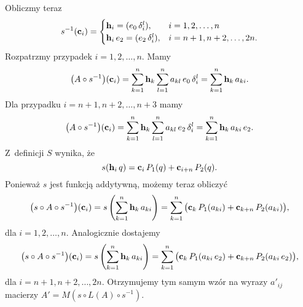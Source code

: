 \documentclass[a4paper,11pt]{article}
\begin{document}
Obliczmy teraz
\begin{equation}
  \label{eq:Wojtynski-87}
  s^{ -1 }( \mathbf{c}_{ i } ) =
  \begin{cases}
    \mathbf{h}_{ i } = ( e_{ 0 } \, \delta^{ l }_{ i } ), &i = 1, 2, \ldots, n \\
    \mathbf{h}_{ i } \, e_{ 2 } = ( e_{ 2 } \, \delta^{ l }_{ i } ),
    &i = n + 1, n + 2, \ldots, 2n.
  \end{cases}
\end{equation}
Rozpatrzmy przypadek $i = 1, 2, \ldots, n$. Mamy
\begin{equation}
  \label{eq:Wojtynski-88}
  \big( A \circ s^{ -1 } \big)( \mathbf{c}_{ i } ) =
  \sum_{ k = 1 }^{ n } \mathbf{h}_{ k } \sum_{ l = 1 }^{ n }
  a_{ k l } \, e_{ 0 } \, \delta^{ l }_{ i } =
  \sum_{ k = 1 }^{ n } \mathbf{h}_{ k } \, a_{ k i }.
\end{equation}
Dla przypadku $i = n + 1, n + 2, \ldots, n + 3$ mamy
\begin{equation}
  \label{eq:Wojtynski-89}
  \big( A \circ s^{ -1 } \big)( \mathbf{c}_{ i } ) =
  \sum_{ k = 1 }^{ n } \mathbf{h}_{ k } \sum_{ l = 1 }^{ n }
  a_{ k l } \, e_{ 2 } \, \delta^{ l }_{ i } =
  \sum_{ k = 1 }^{ n } \mathbf{h}_{ k } \, a_{ k i } \, e_{ 2 }.
\end{equation}
Z~definicji $S$ wynika, że
\begin{equation}
  \label{eq:Wojtynski-90}
  s( \mathbf{h}_{ i } \, q ) =
  \mathbf{c}_{ i } \, P_{ 1 }( q ) + \mathbf{c}_{ i + n } \, P_{ 2 }( q ).
\end{equation}
Ponieważ $s$ jest funkcją addytywną, możemy teraz obliczyć
\begin{equation}
  \label{eq:Wojtynski-91}
  \big( s \circ A \circ s^{ -1 } \big)( \mathbf{c}_{ i } ) =
  s\left( \sum_{ k = 1 }^{ n } \mathbf{h}_{ k } \, a_{ k i } \right) =
  \sum_{ k = 1 }^{ n } \big( \mathbf{c}_{ k } \, P_{ 1 }( a_{ k i } )
  + \mathbf{c}_{ k + n } \, P_{ 2 }( a_{ k i } ) \big),
\end{equation}
dla $i = 1, 2, \ldots, n$. Analogicznie dostajemy
\begin{equation}
  \label{eq:Wojtynski-92}
  \big( s \circ A \circ s^{ -1 } \big)( \mathbf{c}_{ i } ) =
  s\left( \sum_{ k = 1 }^{ n } \mathbf{h}_{ k } \, a_{ k i } \right) =
  \sum_{ k = 1 }^{ n } \big( \mathbf{c}_{ k } \, P_{ 1 }( a_{ k i } \, e_{ 2 } )
  + \mathbf{c}_{ k + n } \, P_{ 2 }( a_{ k i } \, e_{ 2 } ) \big),
\end{equation}
dla $i = n + 1, n + 2, \ldots, 2n$. Otrzymujemy tym samym wzór na wyrazy
$a'_{ i j }$ macierzy $A' = M\!\left( s \circ L( A ) \circ s^{ -1 } \right)$.
\end{document}
